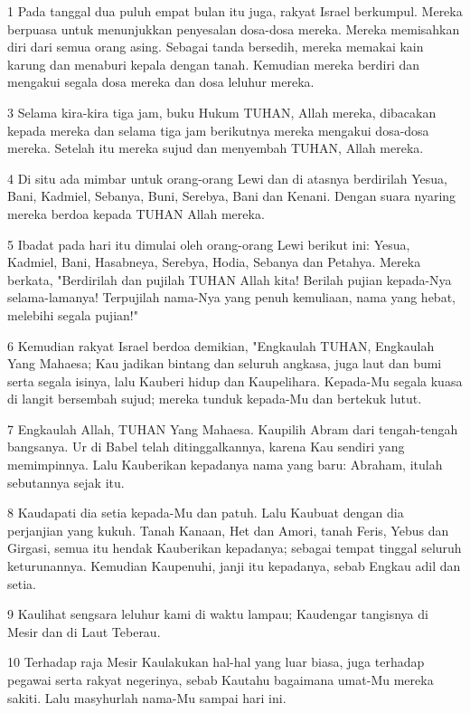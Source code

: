 \par 1 Pada tanggal dua puluh empat bulan itu juga, rakyat Israel berkumpul. Mereka berpuasa untuk menunjukkan penyesalan dosa-dosa mereka. Mereka memisahkan diri dari semua orang asing. Sebagai tanda bersedih, mereka memakai kain karung dan menaburi kepala dengan tanah. Kemudian mereka berdiri dan mengakui segala dosa mereka dan dosa leluhur mereka.
\par 3 Selama kira-kira tiga jam, buku Hukum TUHAN, Allah mereka, dibacakan kepada mereka dan selama tiga jam berikutnya mereka mengakui dosa-dosa mereka. Setelah itu mereka sujud dan menyembah TUHAN, Allah mereka.
\par 4 Di situ ada mimbar untuk orang-orang Lewi dan di atasnya berdirilah Yesua, Bani, Kadmiel, Sebanya, Buni, Serebya, Bani dan Kenani. Dengan suara nyaring mereka berdoa kepada TUHAN Allah mereka.
\par 5 Ibadat pada hari itu dimulai oleh orang-orang Lewi berikut ini: Yesua, Kadmiel, Bani, Hasabneya, Serebya, Hodia, Sebanya dan Petahya. Mereka berkata, "Berdirilah dan pujilah TUHAN Allah kita! Berilah pujian kepada-Nya selama-lamanya! Terpujilah nama-Nya yang penuh kemuliaan, nama yang hebat, melebihi segala pujian!"
\par 6 Kemudian rakyat Israel berdoa demikian, "Engkaulah TUHAN, Engkaulah Yang Mahaesa; Kau jadikan bintang dan seluruh angkasa, juga laut dan bumi serta segala isinya, lalu Kauberi hidup dan Kaupelihara. Kepada-Mu segala kuasa di langit bersembah sujud; mereka tunduk kepada-Mu dan bertekuk lutut.
\par 7 Engkaulah Allah, TUHAN Yang Mahaesa. Kaupilih Abram dari tengah-tengah bangsanya. Ur di Babel telah ditinggalkannya, karena Kau sendiri yang memimpinnya. Lalu Kauberikan kepadanya nama yang baru: Abraham, itulah sebutannya sejak itu.
\par 8 Kaudapati dia setia kepada-Mu dan patuh. Lalu Kaubuat dengan dia perjanjian yang kukuh. Tanah Kanaan, Het dan Amori, tanah Feris, Yebus dan Girgasi, semua itu hendak Kauberikan kepadanya; sebagai tempat tinggal seluruh keturunannya. Kemudian Kaupenuhi, janji itu kepadanya, sebab Engkau adil dan setia.
\par 9 Kaulihat sengsara leluhur kami di waktu lampau; Kaudengar tangisnya di Mesir dan di Laut Teberau.
\par 10 Terhadap raja Mesir Kaulakukan hal-hal yang luar biasa, juga terhadap pegawai serta rakyat negerinya, sebab Kautahu bagaimana umat-Mu mereka sakiti. Lalu masyhurlah nama-Mu sampai hari ini.
